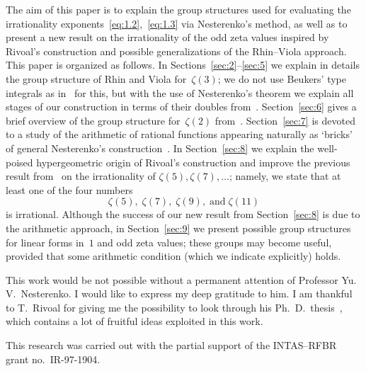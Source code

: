 \documentclass[a4paper,twoside]{article}
\numberwithin{equation}{section}
\renewcommand{\[}{\lfloor}
\renewcommand{\]}{\rfloor}
\newcommand{\<}{\langle}
\renewcommand{\>}{\rangle}
\begin{document}
The aim of this paper is to explain the group structures used
for evaluating the irrationality exponents~\eqref{eq:1.2},~\eqref{eq:1.3}
via Nesterenko's method, as well as to present a new result
on the irrationality of the odd zeta values inspired by Rivoal's
construction and possible generalizations of the Rhin--Viola approach.
This paper is organized as follows. In Sections~\ref{sec:2}--\ref{sec:5}
we explain
in details the group structure of Rhin and Viola for~$\zeta(3)$;
we do not use Beukers' type integrals as in~\cite{RV3} for this,
but with the use of Nesterenko's theorem we explain
all stages of our construction in terms of their doubles from~\cite{RV3}.
Section~\ref{sec:6} gives a brief overview of the group structure
for~$\zeta(2)$ from~\cite{RV2}.
Section~\ref{sec:7} is devoted to a study of the arithmetic of rational
functions appearing naturally as `bricks' of general Nesterenko's
construction~\cite{Ne3}. In Section~\ref{sec:8} we explain
the well-poised hypergeometric origin of
Rivoal's construction and improve the previous result
from~\cite{Ri4,Zu4}
on the irrationality of $\zeta(5),\zeta(7),\dots$; namely,
we state that at least one of the four numbers
$$
\zeta(5), \; \zeta(7), \; \zeta(9), \; \mbox{and} \; \zeta(11)
$$
is irrational. Although the success of our new result from Section~\ref{sec:8}
is due to the arithmetic approach, in Section~\ref{sec:9} we present
possible group structures for linear forms in~$1$ and odd zeta values;
these groups may become useful, provided that some arithmetic condition
(which we indicate explicitly) holds.

\medskip
This work would be not possible without a permanent attention of
Professor Yu.\,V.~Nesterenko. I would like to express my deep
gratitude to him. I am thankful to T.~Rivoal for giving
me the possibility to look through his Ph.~D.~thesis~\cite{Ri3},
which contains a lot of fruitful ideas exploited in this work.

This research was carried out with
the partial support of the INTAS--RFBR grant no.~IR-97-1904.
\end{document}
